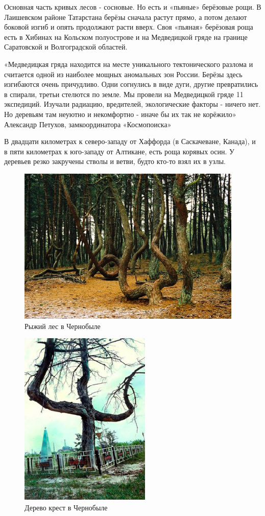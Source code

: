 \documentclass[11pt]{article}
\begin{document}
Основная часть кривых лесов - сосновые. Но есть и «пьяные» берёзовые рощи. В Лаишев­ском районе Татарстана берёзы сначала растут прямо, а потом делают боковой изгиб и опять продолжают расти вверх. Своя «пьяная» берёзовая роща есть в Хибинах на Кольском полуострове и на Медведицкой гряде на границе Саратовской и Волгоградской областей. 

«Медведицкая гряда находится на месте уникального тектонического разлома и считается одной из наиболее мощных аномальных зон России. Берёзы здесь изгибаются очень причудливо. Одни согнулись в виде дуги, другие превратились в спирали, третьи стелются по земле. Мы провели на Медведицкой гряде 11 экспедиций. Изучали радиацию, вредителей, экологические факторы - ничего нет. Но деревьям там неуютно и некомфортно - иначе бы их так не корёжило» Александр Петухов, замкоординатора «Космопоиска» ~\cite{lipatkin}

В двадцати километрах к северо-западу от  Хаффорда (в Саскачеване, Канада), и в пяти километрах к юго-западу от Алтикане, есть роща корявых осин. У деревьев резко закручены стволы и ветви, будто кто-то взял их в узлы.

\begin{figure}[!htpb]
\centering
\includegraphics[scale=0.9]{chernobyl_1}
\caption{Рыжий лес в Чернобыле}
\label{}
\end{figure}


\begin{figure}[!htpb]
\centering
\includegraphics[scale=0.9]{chernobyl_2}
\caption{Дерево крест в Чернобыле}
\label{}
\end{figure}
\end{document}
